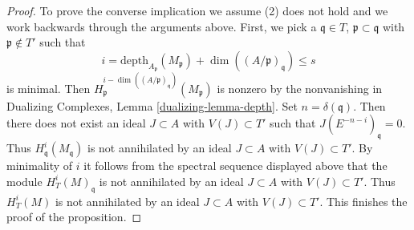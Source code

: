 \begin{proof}
\medskip\noindent
To prove the converse implication we assume (2) does not hold
and we work backwards through the arguments above. First, we pick a
$\mathfrak q \in T$, $\mathfrak p \subset \mathfrak q$
with $\mathfrak p \not \in T'$ such that
$$
i = \text{depth}_{A_\mathfrak p}(M_\mathfrak p) +
\dim((A/\mathfrak p)_\mathfrak q) \leq s
$$
is minimal. Then
$H^{i - \dim((A/\mathfrak p)_\mathfrak q)}_\mathfrak p(M_\mathfrak p)$
is nonzero by the nonvanishing in
Dualizing Complexes, Lemma \ref{dualizing-lemma-depth}.
Set $n = \delta(\mathfrak q)$. Then
there does not exist an ideal $J \subset A$ with $V(J) \subset T'$
such that $J(E^{-n - i})_\mathfrak q = 0$.
Thus $H^i_\mathfrak q(M_\mathfrak q)$ is not
annihilated by an ideal $J \subset A$ with $V(J) \subset T'$.
By minimality of $i$ it follows from the spectral sequence displayed above
that the module $H^i_T(M)_\mathfrak q$
is not annihilated by an ideal $J \subset A$
with $V(J) \subset T'$. Thus $H^i_T(M)$
is not annihilated by an ideal $J \subset A$
with $V(J) \subset T'$. This finishes the proof of the proposition.
\end{proof}